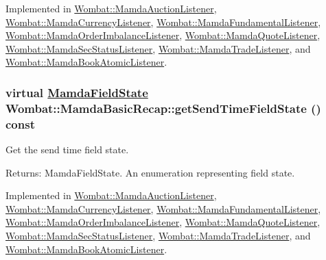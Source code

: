 Implemented in \hyperlink{classWombat_1_1MamdaAuctionListener_8258accabbd79b1ab817055b83aff153}{Wombat::Mamda\-Auction\-Listener}, \hyperlink{classWombat_1_1MamdaCurrencyListener_dc787103b73d10a395458a270e78d69b}{Wombat::Mamda\-Currency\-Listener}, \hyperlink{classWombat_1_1MamdaFundamentalListener_336c86d3f8e9c79c8641e74b146497b3}{Wombat::Mamda\-Fundamental\-Listener}, \hyperlink{classWombat_1_1MamdaOrderImbalanceListener_ccbfe5ac89809e35624d42faa0c40a1b}{Wombat::Mamda\-Order\-Imbalance\-Listener}, \hyperlink{classWombat_1_1MamdaQuoteListener_3937e363870aeca07238a7253653ee6a}{Wombat::Mamda\-Quote\-Listener}, \hyperlink{classWombat_1_1MamdaSecStatusListener_74b08a2717cecd05952794bcc3e9165a}{Wombat::Mamda\-Sec\-Status\-Listener}, \hyperlink{classWombat_1_1MamdaTradeListener_db49cd3341a07e0659b16b6166d56c3a}{Wombat::Mamda\-Trade\-Listener}, and \hyperlink{classWombat_1_1MamdaBookAtomicListener_b3acc7062c4aefa9bc7da4a6f810f5d1}{Wombat::Mamda\-Book\-Atomic\-Listener}.\hypertarget{classWombat_1_1MamdaBasicRecap_ff1be82223cb7fcfdbc80c4f1e43a849}{
\subsubsection[getSendTimeFieldState]{\setlength{\rightskip}{0pt plus 5cm}virtual \hyperlink{namespaceWombat_93aac974f2ab713554fd12a1fa3b7d2a}{Mamda\-Field\-State} Wombat::Mamda\-Basic\-Recap::get\-Send\-Time\-Field\-State () const}}
\label{classWombat_1_1MamdaBasicRecap_ff1be82223cb7fcfdbc80c4f1e43a849}


Get the send time field state. 

\begin{Desc}
\item[Returns:]Mamda\-Field\-State. An enumeration representing field state. \end{Desc}


Implemented in \hyperlink{classWombat_1_1MamdaAuctionListener_721c4b24c7a188038665f28fc03e45c2}{Wombat::Mamda\-Auction\-Listener}, \hyperlink{classWombat_1_1MamdaCurrencyListener_5cbf04e2668f868816b2d7b6461d97dc}{Wombat::Mamda\-Currency\-Listener}, \hyperlink{classWombat_1_1MamdaFundamentalListener_e58cb36ab2dd46fc970fc2ddb3a91aaf}{Wombat::Mamda\-Fundamental\-Listener}, \hyperlink{classWombat_1_1MamdaOrderImbalanceListener_938d4210b58560bf6ee8cb155546a3d8}{Wombat::Mamda\-Order\-Imbalance\-Listener}, \hyperlink{classWombat_1_1MamdaQuoteListener_751c64ca7bad56ffc99ca72e1494fb01}{Wombat::Mamda\-Quote\-Listener}, \hyperlink{classWombat_1_1MamdaSecStatusListener_dce997a03b809f9d8f3adc1f1cce3d82}{Wombat::Mamda\-Sec\-Status\-Listener}, \hyperlink{classWombat_1_1MamdaTradeListener_1a7d2527a9aa376990eb4f50a799996a}{Wombat::Mamda\-Trade\-Listener}, and \hyperlink{classWombat_1_1MamdaBookAtomicListener_158632d4f501353404c44410f71555c4}{Wombat::Mamda\-Book\-Atomic\-Listener}.